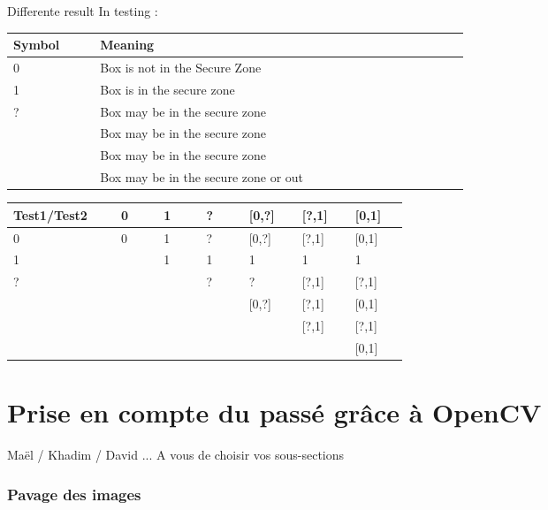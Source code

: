 \documentclass[10pt,a4paper]{report}
\begin{document}
Differente result In testing : \newline

\begin{center}
\begin{tabular}{|m{0.10\linewidth}|m{0.5\linewidth}|}
\hline
 Symbol & Meaning  \\ \hline
 0 & Box is not in the Secure Zone  \\ \hline
 1 &  Box is in the secure zone \\ \hline
 ? &  Box may be in the secure zone  \\ \hline
[0,?] & Box may be in the secure zone \\ \hline
[?,1] & Box may be in the secure zone\\ \hline
[0,1] & Box may be in the secure zone or out \\ \hline
    
   
\end{tabular}
\end{center}


\begin{center}
\begin{tabular}{|m{0.10\linewidth}|m{0.07\linewidth}|m{0.07\linewidth}|m{0.07\linewidth}|m{0.07\linewidth}|m{0.07\linewidth}|m{0.07\linewidth}|}
\hline
Test1/Test2 & 0 & 1 & ? & [0,?] &  [?,1] & [0,1] \\ \hline
          0 & 0 & 1 & ? & [0,?] &  [?,1] & [0,1]  \\ \hline
          1 &   & 1 & 1 &   1   &    1   &   1  \\ \hline
          ? &   &   & ? &   ?   &  [?,1] & [?,1] \\ \hline
      [0,?] &   &   &   & [0,?] &  [?,1] & [0,1] \\ \hline
      [?,1] &   &   &   &       &  [?,1] & [?,1] \\ \hline
      [0,1] &   &   &   &       &        & [0,1]  \\ \hline
    
   
\end{tabular}
\end{center}


\section{Prise en compte du passé grâce à OpenCV}

Maël / Khadim / David  ... A vous de choisir vos sous-sections

\subsubsection{Pavage des images}
\end{document}
